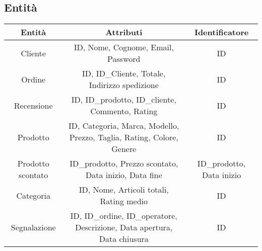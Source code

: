 \subsection{Entità}
\begin{center}
\begin{tabular}{ |c|c|c|} 
\hline
Entità & Attributi & Identificatore \\
\hline
\multirow{4}{6em}{Cliente} & \multirow{4}{8em}{ID, Nome, Cognome, Email, Password} & \multirow{4}{12em}{ID} \\
 &  & \\
 &  & \\
 &  & \\
\hline

\multirow{4}{6em}{Ordine} & \multirow{4}{8em}{ID, ID\_Cliente, Totale, Indirizzo spedizione} & \multirow{4}{12em}{ID} \\
 &  & \\
 &  & \\
 &  & \\
\hline

\multirow{4}{6em}{Recensione} & \multirow{4}{8em}{ID, ID\_prodotto, ID\_cliente, Commento, Rating} & \multirow{4}{12em}{ID} \\
 &  & \\
 &  & \\
 &  & \\
\hline

\multirow{5}{6em}{Prodotto} & \multirow{5}{8em}{ID, Categoria, Marca, Modello, Prezzo, Taglia, Rating, Colore, Genere} & \multirow{5}{12em}{ID} \\
 &  & \\
 &  & \\
 &  & \\
 &  & \\
\hline

\multirow{4}{6em}{Prodotto scontato} & \multirow{4}{8em}{ID\_prodotto, Prezzo scontato, Data inizio, Data fine} & \multirow{4}{12em}{ID\_prodotto, Data inizio} \\
 &  & \\
 &  & \\
 &  & \\
\hline

\multirow{3}{6em}{Categoria} & \multirow{3}{8em}{ID, Nome, Articoli totali, Rating medio} & \multirow{3}{12em}{ID} \\
 &  & \\
 &  & \\ 
\hline

\multirow{5}{6em}{Segnalazione} & \multirow{5}{8em}{ID, ID\_ordine, ID\_operatore, Descrizione, Data apertura, Data chiusura} & \multirow{5}{12em}{ID} \\
 &  & \\
 &  & \\
 &  & \\
 &  & \\
\hline


\end{tabular}
\end{center}
